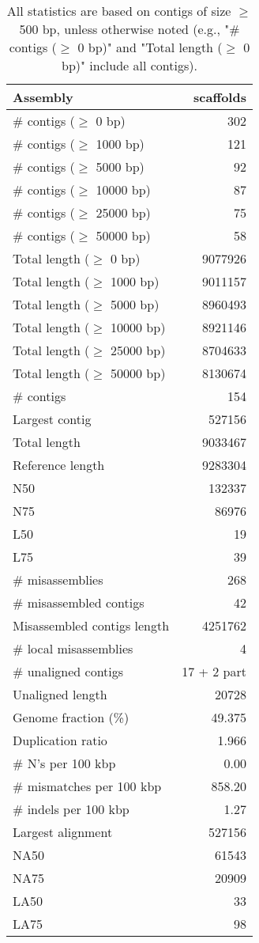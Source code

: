 \documentclass[12pt,a4paper]{article}
\begin{document}
\begin{table}[ht]
\begin{center}
\caption{All statistics are based on contigs of size $\geq$ 500 bp, unless otherwise noted (e.g., "\# contigs ($\geq$ 0 bp)" and "Total length ($\geq$ 0 bp)" include all contigs).}
\begin{tabular}{|l*{1}{|r}|}
\hline
Assembly & scaffolds \\ \hline
\# contigs ($\geq$ 0 bp) & 302 \\ \hline
\# contigs ($\geq$ 1000 bp) & 121 \\ \hline
\# contigs ($\geq$ 5000 bp) & 92 \\ \hline
\# contigs ($\geq$ 10000 bp) & 87 \\ \hline
\# contigs ($\geq$ 25000 bp) & 75 \\ \hline
\# contigs ($\geq$ 50000 bp) & 58 \\ \hline
Total length ($\geq$ 0 bp) & 9077926 \\ \hline
Total length ($\geq$ 1000 bp) & 9011157 \\ \hline
Total length ($\geq$ 5000 bp) & 8960493 \\ \hline
Total length ($\geq$ 10000 bp) & 8921146 \\ \hline
Total length ($\geq$ 25000 bp) & 8704633 \\ \hline
Total length ($\geq$ 50000 bp) & 8130674 \\ \hline
\# contigs & 154 \\ \hline
Largest contig & 527156 \\ \hline
Total length & 9033467 \\ \hline
Reference length & 9283304 \\ \hline
N50 & 132337 \\ \hline
N75 & 86976 \\ \hline
L50 & 19 \\ \hline
L75 & 39 \\ \hline
\# misassemblies & 268 \\ \hline
\# misassembled contigs & 42 \\ \hline
Misassembled contigs length & 4251762 \\ \hline
\# local misassemblies & 4 \\ \hline
\# unaligned contigs & 17 + 2 part \\ \hline
Unaligned length & 20728 \\ \hline
Genome fraction (\%) & 49.375 \\ \hline
Duplication ratio & 1.966 \\ \hline
\# N's per 100 kbp & 0.00 \\ \hline
\# mismatches per 100 kbp & 858.20 \\ \hline
\# indels per 100 kbp & 1.27 \\ \hline
Largest alignment & 527156 \\ \hline
NA50 & 61543 \\ \hline
NA75 & 20909 \\ \hline
LA50 & 33 \\ \hline
LA75 & 98 \\ \hline
\end{tabular}
\end{center}
\end{table}
\end{document}
